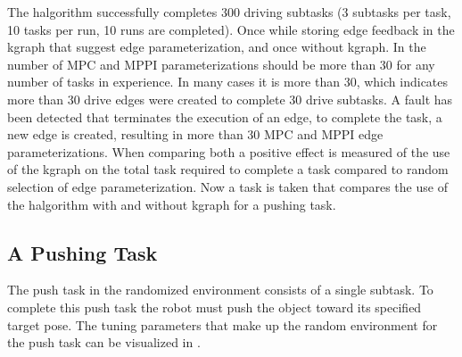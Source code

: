 The \ac{halgorithm} successfully completes 300 driving subtasks (3 subtasks per task, 10 tasks per run, 10 runs are completed). Once while storing edge feedback in the \ac{kgraph} that suggest edge parameterization, and once without \ac{kgraph}. In  the number of \ac{MPC} and \ac{MPPI} parameterizations should be more than 30 for any number of tasks in experience. In many cases it is more than 30, which indicates more than 30 drive edges were created to complete 30 drive subtasks. A fault has been detected that terminates the execution of an edge, to complete the task, a new edge is created, resulting in more than 30 \ac{MPC} and \ac{MPPI} edge parameterizations. When comparing both a positive effect is measured of the use of the \ac{kgraph} on the total task required to complete a task compared to random selection of edge parameterization. Now a task is taken that compares the use of the \ac{halgorithm} with and without \ac{kgraph} for a pushing task.\bs
{}

\subsection{A Pushing Task}%
\label{subsec:rand_pushing}
The push task in the randomized environment consists of a single subtask. To complete this push task the robot must push the object toward its specified target pose. The tuning parameters that make up the random environment for the push task can be visualized in .\bs
{}

